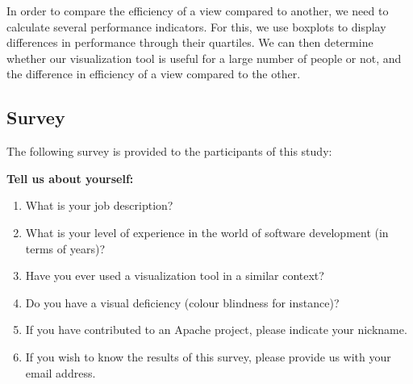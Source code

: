 In order to compare the efficiency of a view compared to another, we need to calculate several performance indicators. For this, we use boxplots to display differences in performance through their quartiles. We can then determine whether our visualization tool is useful for a large number of people or not, and the difference in efficiency of a view compared to the other.

\subsection{Survey}

The following survey is provided to the participants of this study:

\textbf{Tell us about yourself:}
\begin{enumerate}
\itemsep-0.2em
\item What is your job description?
\item What is your level of experience in the world of software development (in terms of years)?
\item Have you ever used a visualization tool in a similar context?
\item Do you have a visual deficiency (colour blindness for instance)?
\item If you have contributed to an Apache project, please indicate your nickname.
\item If you wish to know the results of this survey, please provide us with your email address.
\end{enumerate}

